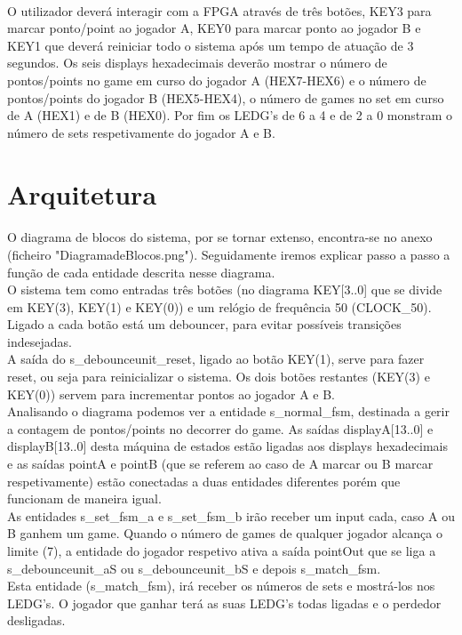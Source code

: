 \documentclass[a4paper, 11pt, oneside]{report}
\begin{document}
\paragraph{} O utilizador deverá interagir com a FPGA através de três botões, KEY3 para marcar ponto/point ao jogador A, KEY0 para marcar ponto ao jogador B e KEY1 que deverá reiniciar todo o sistema após um tempo de atuação de 3 segundos. Os seis displays hexadecimais deverão mostrar o número de pontos/points no game em curso do jogador A (HEX7-HEX6) e o número de pontos/points do jogador B (HEX5-HEX4), o número de games no set em curso de A (HEX1) e de B (HEX0). Por fim os LEDG's de 6 a 4 e de 2 a 0 monstram o número de sets respetivamente do jogador A e B. \\

\section{Arquitetura}

\paragraph{} O diagrama de blocos do sistema, por se tornar extenso, encontra-se no anexo (ficheiro "DiagramadeBlocos.png"). Seguidamente iremos explicar passo a passo a função de cada entidade descrita nesse diagrama. \\
\indent O sistema tem como entradas três botões (no diagrama KEY[3..0] que se divide em KEY(3), KEY(1) e KEY(0)) e um relógio de frequência 50 (CLOCK\_50). Ligado a cada botão está um debouncer, para evitar possíveis transições indesejadas. \\
\indent A saída do s\_debounceunit\_reset, ligado ao botão KEY(1), serve para fazer reset,  ou seja para reinicializar o sistema. Os dois botões restantes (KEY(3) e KEY(0)) servem para incrementar pontos ao jogador A e B. \\
\indent Analisando o diagrama podemos ver a entidade s\_normal\_fsm, destinada a gerir a contagem de pontos/points no decorrer do game. As saídas displayA[13..0] e displayB[13..0] desta máquina de estados estão ligadas aos displays hexadecimais e as saídas pointA e pointB (que se referem ao caso de A marcar ou B marcar respetivamente) estão conectadas a duas entidades diferentes porém que funcionam de maneira igual. \\
\indent As entidades s\_set\_fsm\_a e s\_set\_fsm\_b irão receber um input cada, caso A ou B ganhem um game. Quando o número de games de qualquer jogador alcança o limite (7), a entidade do jogador respetivo ativa a saída pointOut que se liga a s\_debounceunit\_aS ou s\_debounceunit\_bS e depois s\_match\_fsm. \\
\indent Esta entidade (s\_match\_fsm), irá receber os números de sets e mostrá-los nos LEDG’s. O jogador que ganhar terá as suas LEDG’s todas ligadas e o perdedor desligadas. \\
\end{document}

